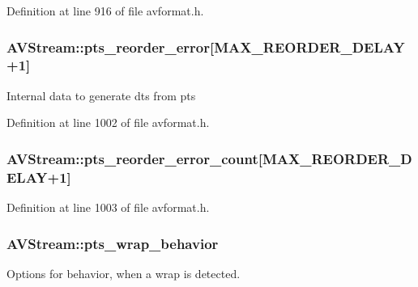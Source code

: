 Definition at line 916 of file avformat.\+h.

\subsubsection[{\texorpdfstring{pts\+\_\+reorder\+\_\+error}{pts_reorder_error}}]{ A\+V\+Stream\+::pts\+\_\+reorder\+\_\+error\mbox{[}{\bf M\+A\+X\+\_\+\+R\+E\+O\+R\+D\+E\+R\+\_\+\+D\+E\+L\+AY}+1\mbox{]}}\hypertarget{struct_a_v_stream_ad3e2b5f6e98424f1e5e5bfc909cee38b}{}\label{struct_a_v_stream_ad3e2b5f6e98424f1e5e5bfc909cee38b}
Internal data to generate dts from pts 

Definition at line 1002 of file avformat.\+h.

\subsubsection[{\texorpdfstring{pts\+\_\+reorder\+\_\+error\+\_\+count}{pts_reorder_error_count}}]{ A\+V\+Stream\+::pts\+\_\+reorder\+\_\+error\+\_\+count\mbox{[}{\bf M\+A\+X\+\_\+\+R\+E\+O\+R\+D\+E\+R\+\_\+\+D\+E\+L\+AY}+1\mbox{]}}\hypertarget{struct_a_v_stream_acd6fe77bbabf1ad6727492a2749e5275}{}\label{struct_a_v_stream_acd6fe77bbabf1ad6727492a2749e5275}


Definition at line 1003 of file avformat.\+h.

\subsubsection[{\texorpdfstring{pts\+\_\+wrap\+\_\+behavior}{pts_wrap_behavior}}]{ A\+V\+Stream\+::pts\+\_\+wrap\+\_\+behavior}\hypertarget{struct_a_v_stream_aeb3eeb80578432b07b73cb5951c07c5c}{}\label{struct_a_v_stream_aeb3eeb80578432b07b73cb5951c07c5c}
Options for behavior, when a wrap is detected.

